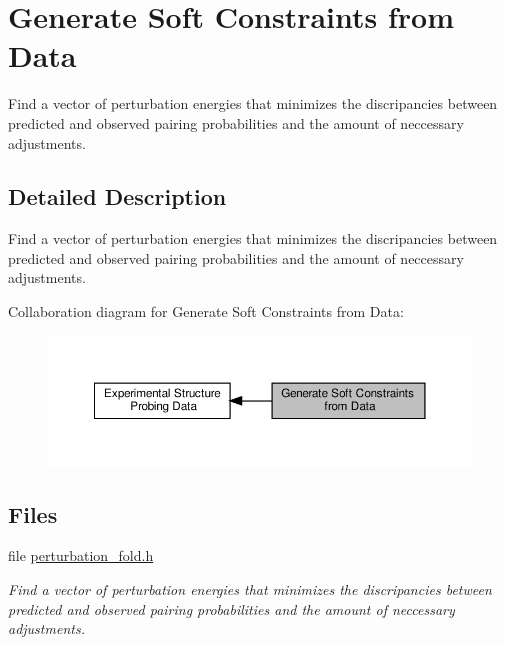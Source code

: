 \hypertarget{group__perturbation}{}\section{Generate Soft Constraints from Data}
\label{group__perturbation}


Find a vector of perturbation energies that minimizes the discripancies between predicted and observed pairing probabilities and the amount of neccessary adjustments.  




\subsection{Detailed Description}
Find a vector of perturbation energies that minimizes the discripancies between predicted and observed pairing probabilities and the amount of neccessary adjustments. 

Collaboration diagram for Generate Soft Constraints from Data\+:
\nopagebreak
\begin{figure}[H]
\begin{center}
\leavevmode
\includegraphics[width=350pt]{group__perturbation}
\end{center}
\end{figure}
\subsection*{Files}
\begin{DoxyCompactItemize}
\item 
file \hyperlink{perturbation__fold_8h}{perturbation\+\_\+fold.\+h}
\begin{DoxyCompactList}\small\item\em Find a vector of perturbation energies that minimizes the discripancies between predicted and observed pairing probabilities and the amount of neccessary adjustments. \end{DoxyCompactList}\end{DoxyCompactItemize}
